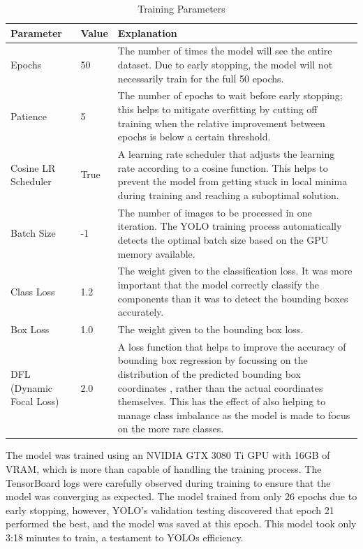 \begin{table}[H]
  \centering
  \begin{tabularx}{0.9\textwidth}{|p{4cm}|p{1.5cm}|X|}
    \hline
    \textbf{Parameter} & \textbf{Value} & \textbf{Explanation} \\
    \hline
    Epochs & 50 & The number of times the model will see the entire dataset. Due to early stopping, the model will not necessarily train for the full 50 epochs. \\
    \hline
    Patience & 5 & The number of epochs to wait before early stopping; this helps to mitigate overfitting by cutting off training when the relative improvement between epochs is below a certain threshold. \\
    \hline
    Cosine LR Scheduler & True & A learning rate scheduler that adjusts the learning rate according to a cosine function. This helps to prevent the model from getting stuck in local minima during training and reaching a suboptimal solution. \\
    \hline
    Batch Size & -1 & The number of images to be processed in one iteration. The YOLO training process automatically detects the optimal batch size based on the GPU memory available. \\
    \hline
    Class Loss & 1.2 & The weight given to the classification loss. It was more important that the model correctly classify the components than it was to detect the bounding boxes accurately. \\
    \hline
    Box Loss & 1.0 & The weight given to the bounding box loss. \\
    \hline
    DFL (Dynamic Focal Loss) & 2.0 & A loss function that helps to improve the accuracy of bounding box regression by focussing on the distribution of the predicted bounding box coordinates \cite{detection_2020}, rather than the actual coordinates themselves. This has the effect of also helping to manage class imbalance as the model is made to focus on the more rare classes. \\
    \hline
  \end{tabularx}
  \caption{Training Parameters}
  \label{tab:training-parameters}
\end{table}

The model was trained using an NVIDIA GTX 3080 Ti GPU with 16GB of VRAM, which is more than capable of handling the training process. The TensorBoard logs were carefully observed during training to ensure that the model was converging as expected. The model trained from only 26 epochs due to early stopping, however, YOLO's validation testing discovered that epoch 21 performed the best, and the model was saved at this epoch. This model took only 3:18 minutes to train, a testament to YOLOs efficiency.

